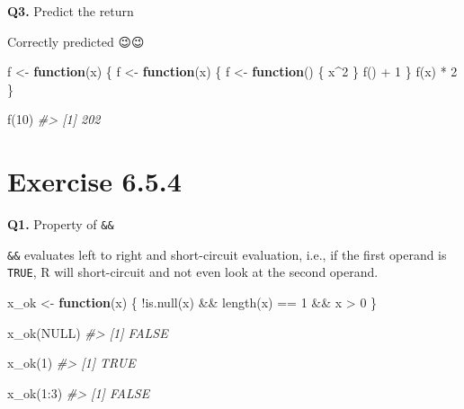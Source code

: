 \documentclass[
]{book}
\newenvironment{Shaded}{\begin{snugshade}}{\end{snugshade}}
\newcommand{\CommentTok}[1]{\textcolor[rgb]{0.56,0.35,0.01}{\textit{#1}}}
\newcommand{\ConstantTok}[1]{\textcolor[rgb]{0.00,0.00,0.00}{#1}}
\newcommand{\ControlFlowTok}[1]{\textcolor[rgb]{0.13,0.29,0.53}{\textbf{#1}}}
\newcommand{\DecValTok}[1]{\textcolor[rgb]{0.00,0.00,0.81}{#1}}
\newcommand{\FunctionTok}[1]{\textcolor[rgb]{0.00,0.00,0.00}{#1}}
\newcommand{\NormalTok}[1]{#1}
\newcommand{\OtherTok}[1]{\textcolor[rgb]{0.56,0.35,0.01}{#1}}
\newcommand{\SpecialCharTok}[1]{\textcolor[rgb]{0.00,0.00,0.00}{#1}}
\begin{document}
\textbf{Q3.} Predict the return

Correctly predicted 😉😉

\begin{Shaded}
\begin{Highlighting}[]
\NormalTok{f }\OtherTok{\textless{}{-}} \ControlFlowTok{function}\NormalTok{(x) \{}
\NormalTok{  f }\OtherTok{\textless{}{-}} \ControlFlowTok{function}\NormalTok{(x) \{}
\NormalTok{    f }\OtherTok{\textless{}{-}} \ControlFlowTok{function}\NormalTok{() \{}
\NormalTok{      x}\SpecialCharTok{\^{}}\DecValTok{2}
\NormalTok{    \}}
    \FunctionTok{f}\NormalTok{() }\SpecialCharTok{+} \DecValTok{1}
\NormalTok{  \}}
  \FunctionTok{f}\NormalTok{(x) }\SpecialCharTok{*} \DecValTok{2}
\NormalTok{\}}

\FunctionTok{f}\NormalTok{(}\DecValTok{10}\NormalTok{)}
\CommentTok{\#\textgreater{} [1] 202}
\end{Highlighting}
\end{Shaded}

\hypertarget{exercise-6.5.4}{%
\section{Exercise 6.5.4}\label{exercise-6.5.4}}

\textbf{Q1.} Property of \texttt{\&\&}

\texttt{\&\&} evaluates left to right and short-circuit evaluation, i.e., if the first operand is \texttt{TRUE}, R will short-circuit and not even look at the second operand.

\begin{Shaded}
\begin{Highlighting}[]
\NormalTok{x\_ok }\OtherTok{\textless{}{-}} \ControlFlowTok{function}\NormalTok{(x) \{}
  \SpecialCharTok{!}\FunctionTok{is.null}\NormalTok{(x) }\SpecialCharTok{\&\&} \FunctionTok{length}\NormalTok{(x) }\SpecialCharTok{==} \DecValTok{1} \SpecialCharTok{\&\&}\NormalTok{ x }\SpecialCharTok{\textgreater{}} \DecValTok{0}
\NormalTok{\}}

\FunctionTok{x\_ok}\NormalTok{(}\ConstantTok{NULL}\NormalTok{)}
\CommentTok{\#\textgreater{} [1] FALSE}

\FunctionTok{x\_ok}\NormalTok{(}\DecValTok{1}\NormalTok{)}
\CommentTok{\#\textgreater{} [1] TRUE}

\FunctionTok{x\_ok}\NormalTok{(}\DecValTok{1}\SpecialCharTok{:}\DecValTok{3}\NormalTok{)}
\CommentTok{\#\textgreater{} [1] FALSE}
\end{Highlighting}
\end{Shaded}
\end{document}
